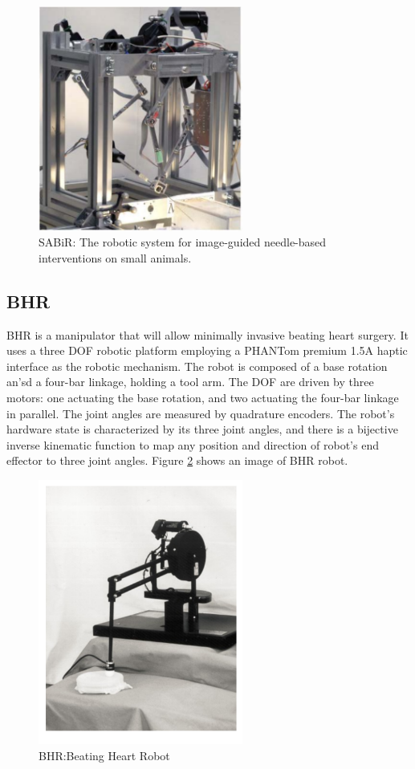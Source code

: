 \begin{figure}[!thpb]
\centering
\includegraphics[width=0.6\textwidth]{chapter5_SABiR.pdf}
\caption{SABiR: The robotic system for image-guided needle-based interventions on small animals.}
\label{sabir}
\end{figure}

\subsection{BHR}
BHR is a manipulator that will allow minimally invasive beating heart surgery\cite{bebek2008robotic}. It uses a three DOF robotic platform employing a PHANTom premium 1.5A haptic interface \cite{cavusoglu2001kinematics} as the robotic mechanism. The robot is composed of a base rotation an’sd a four-bar linkage, holding a tool arm. The DOF are driven by three motors: one actuating the base rotation, and two actuating the four-bar linkage in parallel. The joint angles are measured by quadrature encoders. The robot’s hardware state is characterized by its three joint angles, and there is a bijective inverse kinematic function to map any position and direction of robot’s end effector to three joint angles. Figure \ref{bhr} shows an image of BHR robot.

\begin{figure}[!thpb]
\centering
\includegraphics[width=0.6\textwidth]{chapter5_BHR.pdf}
\caption{BHR:Beating Heart Robot}
\label{bhr}
\end{figure}

